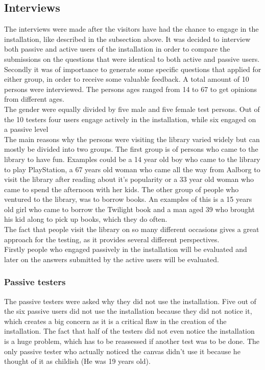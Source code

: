\subsection{Interviews}
The interviews were made after the visitors have had the chance to engage in the installation, like described in the subsection above. It was decided to interview both passive and active users of the installation in order to compare the submissions on the questions that were identical to both active and passive users. Secondly it was of importance to generate some specific questions that applied for either group, in order to receive some valuable feedback. A total amount of 10 persons were interviewed. The persons ages ranged from 14 to 67 to get opinions from different ages.\\
The gender were equally divided by five male and five female test persons. Out of the 10 testers four users engage actively in the installation, while six engaged on a passive level\\
The main reasons why the persons were visiting the library varied widely but can mostly be divided into two groups. The first group is of persons who came to the library to have fun. Examples could be a 14 year old boy who came to the library to play PlayStation, a 67 years old woman who came all the way from Aalborg to visit the library after reading about it's popularity or a 33 year old woman who came to spend the afternoon with her kids. The other group of people who ventured to the library, was to borrow books. An examples of this is a 15 years old girl who came to borrow the Twilight book and a man aged 39 who brought his kid along to pick up books, which they do often.\\
The fact that people visit the library on so many different occasions gives a great approach for the testing, as it provides several different perspectives.\\

Firstly people who engaged passively in the installation will be evaluated and later on the answers submitted by the active users will be evaluated.\\

\subsubsection{Passive testers}
The passive testers were asked why they did not use the installation. Five out of the six passive users did not use the installation because they did not notice it, which creates a big concern as it is a critical flaw in the creation of the installation. The fact that half of the testers did not even notice the installation is a huge problem, which has to be reassessed if another test was to be done. The only passive tester who actually noticed the canvas didn't use it because he thought of it as childish (He was 19 years old).

